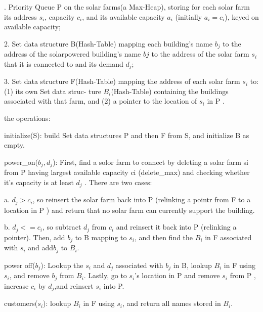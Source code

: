 \documentclass[12pt,twoside]{article}
\begin{document}
\begin{problems}
\newpage
{}. Priority Queue P on the solar farms(a Max-Heap), storing for each solar farm its address $s_i$, capacity $c_i$,
and its available capacity $a_i$ (initially $a_i = c_i$), keyed on available capacity;\par
2. Set data structure B(Hash-Table) mapping each building’s name $b_j$ to the address of the solarpowered building’s name $bj$ to the address of the solar
farm $s_i$ that it is connected to and its demand $d_j$;\par
3. Set data structure F(Hash-Table) mapping the address of each solar farm $s_i$ to: (1) its own Set data struc-
ture $B_i$(Hash-Table) containing the buildings associated with that farm, and (2) a pointer to the location of
$s_i$ in P .\par
the operations:\par
initialize(S): build Set data structures P and then F from S, and initialize B as empty. \par
power\_on($b_j,d_j$):  First, find a solor farm to connect by deleting a solar farm si from P
having largest available capacity ci (delete\_max) and checking whether it’s capacity is at
least $d_j$ . There are two cases:\par
a. $d_j > c_i$, so reinsert the solar farm back into P (relinking a pointr from F to a location
in P ) and return that no solar farm can currently support the building.\par
b. $d_j <= c_i$, so subtract $d_j$ from $c_i$ and reinsert it back into P (relinking a pointer). Then,
add $b_j$ to B mapping to $s_i$, and then find the $B_i$ in F associated with $s_i$ and add$b_j$ to $B_i$.
\par
power off($b_j$): Lookup the $s_i$ and $d_j$ associated with $b_j$ in B, lookup $B_i$ in F using $s_i$, and
remove $b_j$ from $B_i$. Lastly, go to $s_i$’s location in P and remove $s_i$ from P , increase $c_i$ by
$d_j$,and reinsert $s_i$ into P. \par
customers($s_i$): lookup $B_i$ in F using $s_i$, and return all names stored in $B_i$. \par


\end{problems}
\end{document}
